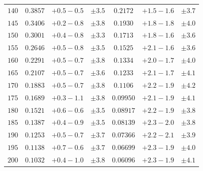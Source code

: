 \begin{table}
\begin{center}
\begin{tabular}{ccccccc}
$ 140 $ & $   0.3857 $ & $ +0.5   -\!0.5  $ & 
$ \pm 3.5 $
 & $   0.2172 $ & $ +1.5   -\!1.6  $ &
$ \pm 3.7 $ \\[.2em]

$ 145 $ & $   0.3406 $ & $ +0.2   -\!0.8  $ & 
$ \pm 3.8 $
 & $   0.1930 $ & $ +1.8   -\!1.8  $ &
$ \pm 4.0 $ \\[.2em]

$ 150 $ & $   0.3001 $ & $ +0.4   -\!0.8  $ & 
$ \pm 3.3 $
 & $   0.1713 $ & $ +1.8   -\!1.6  $ &
$ \pm 3.6 $ \\[.2em]

$ 155 $ & $   0.2646 $ & $ +0.5   -\!0.8  $ & 
$ \pm 3.5 $
 & $   0.1525 $ & $ +2.1   -\!1.6  $ &
$ \pm 3.6 $ \\[.2em]

$ 160 $ & $   0.2291 $ & $ +0.5   -\!0.7  $ & 
$ \pm 3.8 $
 & $   0.1334 $ & $ +2.0   -\!1.7  $ &
$ \pm 4.0 $ \\[.2em]

$ 165 $ & $   0.2107 $ & $ +0.5   -\!0.7  $ & 
$ \pm 3.6 $
 & $   0.1233 $ & $ +2.1   -\!1.7  $ &
$ \pm 4.1 $ \\[.2em]

$ 170 $ & $   0.1883 $ & $ +0.5   -\!0.7  $ & 
$ \pm 3.8 $
 & $   0.1106 $ & $ +2.2   -\!1.9  $ &
$ \pm 4.2 $ \\[.2em]

$ 175 $ & $   0.1689 $ & $ +0.3   -\!1.1  $ & 
$ \pm 3.8 $
 & $  0.09950 $ & $ +2.1   -\!1.9  $ &
$ \pm 4.1 $ \\[.2em]

$ 180 $ & $   0.1521 $ & $ +0.6   -\!0.6  $ & 
$ \pm 3.5 $
 & $  0.08917 $ & $ +2.2   -\!1.9  $ &
$ \pm 3.8 $ \\[.2em]

$ 185 $ & $   0.1387 $ & $ +0.4   -\!0.9  $ & 
$ \pm 3.5 $
 & $  0.08139 $ & $ +2.3   -\!2.0  $ &
$ \pm 3.8 $ \\[.2em]

$ 190 $ & $   0.1253 $ & $ +0.5   -\!0.7  $ & 
$ \pm 3.7 $
 & $  0.07366 $ & $ +2.2   -\!2.1  $ &
$ \pm 3.9 $ \\[.2em]

$ 195 $ & $   0.1138 $ & $ +0.7   -\!0.6  $ & 
$ \pm 3.7 $
 & $  0.06699 $ & $ +2.3   -\!1.9  $ &
$ \pm 4.0 $ \\[.2em]

$ 200 $ & $   0.1032 $ & $ +0.4   -\!1.0  $ & 
$ \pm 3.8 $
 & $  0.06096 $ & $ +2.3   -\!1.9  $ &
$ \pm 4.1 $ \\[.2em]


\end{tabular}
\end{center}
\end{table}
